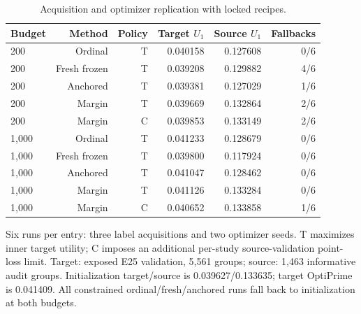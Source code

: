 \begin{table}[htbp]
\centering\small
\caption{Acquisition and optimizer replication with locked recipes.}
\label{tab:replication}
\begin{tabular}{lrrrrr}
\toprule
Budget & Method & Policy & Target $U_1$ & Source $U_1$ & Fallbacks \\
\midrule
200 & Ordinal & T & 0.040158 & 0.127608 & 0/6 \\
200 & Fresh frozen & T & 0.039208 & 0.129882 & 4/6 \\
200 & Anchored & T & 0.039381 & 0.127029 & 1/6 \\
200 & Margin & T & 0.039669 & 0.132864 & 2/6 \\
200 & Margin & C & 0.039853 & 0.133149 & 2/6 \\
1,000 & Ordinal & T & 0.041233 & 0.128679 & 0/6 \\
1,000 & Fresh frozen & T & 0.039800 & 0.117924 & 0/6 \\
1,000 & Anchored & T & 0.041047 & 0.128462 & 0/6 \\
1,000 & Margin & T & 0.041126 & 0.133284 & 0/6 \\
1,000 & Margin & C & 0.040652 & 0.133858 & 1/6 \\
\bottomrule
\end{tabular}
\par\smallskip
\begin{minipage}{\linewidth}\footnotesize Six runs per entry: three label acquisitions and two optimizer seeds. T maximizes inner target utility; C imposes an additional per-study source-validation point-loss limit. Target: exposed E25 validation, 5,561 groups; source: 1,463 informative audit groups. Initialization target/source is 0.039627/0.133635; target OptiPrime is 0.041409. All constrained ordinal/fresh/anchored runs fall back to initialization at both budgets.\end{minipage}
\end{table}
